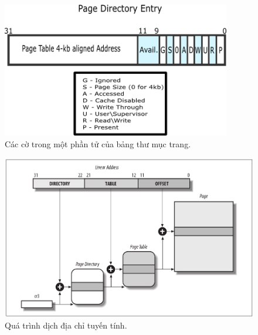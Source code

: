 \documentclass[12pt]{report}
\begin{document}
\begin{figure}[h]
\centering
\caption{Các cờ trong một phần tử của bảng thư mục trang.}
\includegraphics[width=10cm]{ptd_flags.png}
\end{figure}

\begin{figure}[h]
\centering
\caption{Quá  trình dịch địa chỉ tuyến tính.}
\includegraphics[width=\textwidth]{paging.png}
\end{figure}


\end{document}

